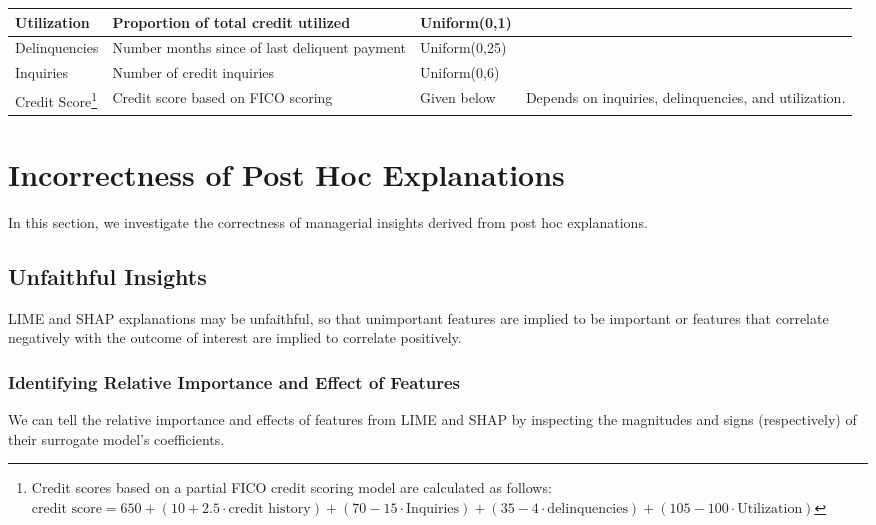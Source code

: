 \documentclass[11pt]{article}    %
\begin{document}
\begin{table}[h]
{\begin{tabular}{|l|l|l|l|}
Utilization      & Proportion of total credit utilized            & Uniform(0,1)           & %
\\ \hline
Delinquencies    & Number months since of last deliquent payment                   & Uniform(0,25)          &                                              \\ \hline
Inquiries         & Number of credit inquiries                     & Uniform(0,6)           &                                              \\ \hline
Credit Score\footnote{Credit scores based on a partial FICO credit scoring model \citep{ligons_fico} are calculated as follows: $\text{credit score} = 650 + (10 + 2.5\cdot \text{credit history}) + (70 - 15 \cdot \text{Inquiries}) + (35 - 4 \cdot \text{delinquencies}) + (105 - 100 \cdot \text{Utilization})$}     & Credit score based on FICO scoring             & Given below            & Depends on inquiries, delinquencies, and utilization.                                             \\ \hline
\end{tabular}%
}
\label{tab:simulated}
\end{table}



\section{Incorrectness of Post Hoc Explanations}
    In this section, we investigate the correctness of managerial insights derived from post hoc explanations.


            \subsection{Unfaithful  Insights}
                \label{sec:unfaithful_descriptive}
                LIME and SHAP explanations may be unfaithful, so that unimportant features are implied to be important or features that correlate negatively with the outcome of interest are implied to correlate positively. 


                \subsubsection{Identifying Relative Importance and Effect of Features}
                    \label{sec:relative_and_signed_importance}
                    We can tell the relative importance and effects of features from LIME and SHAP by inspecting the magnitudes and signs (respectively) of their surrogate model's coefficients. 
 
\end{document}

